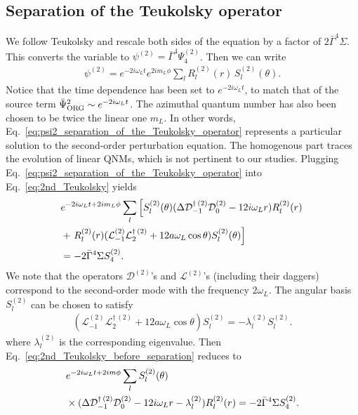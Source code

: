 \documentclass[aps,prd,amsmath,floats,floatfix, twocolumn,
superscriptaddress,nofootinbib,showpacs]{revtex4-1}
\newcommand{\hertzbar}{\bar{\Psi}_{\rm ORG}}
\begin{document}
\subsection{Separation of the Teukolsky operator}
\label{subsec:separation_Teukolsky}
We follow Teukolsky \cite{Teukolsky:1973ApJ} and rescale both sides of the equation by a factor of $2\bar{\Gamma}^4\Sigma$. This converts the variable to $\psi^{(2)}=\bar{\Gamma}^4\Psi_4^{(2)}$. Then we can write 
\begin{align}
    \psi^{(2)} = e^{-2i\omega_{L} t}e^{2im_L \phi}\sum_{l} R^{(2)}_{l}(r) \, S^{(2)}_{l}(\theta) . \label{eq:psi2_separation_of_the_Teukolsky_operator}
\end{align}
Notice that the time dependence has been set to $e^{-2i\omega_{L} t}$, to match that of the source term $\hertzbar^2\sim e^{-2i\omega_{L} t}$. The azimuthal quantum number has also been chosen to be twice the linear one $m_L$. In other words, Eq.~\eqref{eq:psi2_separation_of_the_Teukolsky_operator} represents a particular solution to the second-order perturbation equation. The homogenous part traces the evolution of linear QNMs, which is not pertinent to our studies. Plugging Eq.~\eqref{eq:psi2_separation_of_the_Teukolsky_operator} into Eq.~\eqref{eq:2nd_Teukolsky} yields
\begin{align}
    & e^{-2i\omega_L t+2im_L\phi}\sum_{l} \left[ S_{l}^{(2)}(\theta) (\Delta \mathcal{D}_{-1}^{\dagger\,(2)}\mathcal{D}^{(2)}_0-12i\omega_L r) R_{l}^{(2)}(r) \right. \notag \\
    &+\left.R_{l}^{(2)}(r)  (\mathcal{L}^{(2)}_{-1}\mathcal{L}_2^{\dagger\,(2)}+12a\omega_L \cos\theta) S_{l}^{(2)}(\theta) \right]  \notag \\
    & = - 2\bar{\Gamma}^4\Sigma S_4^{(2)} . \label{eq:2nd_Teukolsky_before_separation}
\end{align}
We note that the operators $\mathcal{D}^{(2)}$'s and $\mathcal{L}^{(2)}$'s (including their daggers) correspond to the second-order mode with the frequency $2\omega_L$. The angular basis $S_{l}^{(2)}$ can be chosen to satisfy 
\begin{align}
(\mathcal{L}^{(2)}_{-1}\mathcal{L}_2^{\dagger\,(2)}+12a\omega_L \cos\theta )S_{l}^{(2)} = -\lambda^{(2)}_l  S_{l}^{(2)}.
\end{align}
where $\lambda^{(2)}_l$ is the corresponding eigenvalue.
Then Eq.~\eqref{eq:2nd_Teukolsky_before_separation} reduces to 
\begin{align}
    & e^{-2i\omega_L t+2im\phi} \sum_{l} S_{l}^{(2)}(\theta) \notag \\
    &\times(\Delta \mathcal{D}_{-1}^{\dagger\,(2)}\mathcal{D}^{(2)}_0-12i\omega_L r-\lambda^{(2)}_l) R_{l}^{(2)}(r)  = - 2\bar{\Gamma}^4\Sigma S_4^{(2)} . \label{eq:2nd_Teukolsky_after_angular}
\end{align}
\end{document}
